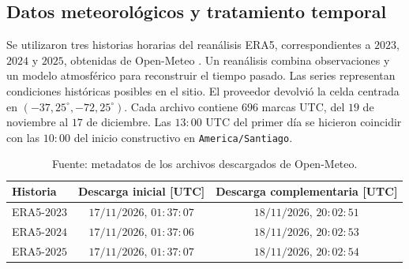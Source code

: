 \subsection{Datos meteorológicos y tratamiento temporal}
\label{sec:Meteorologicos}
Se utilizaron tres historias horarias del reanálisis ERA5, correspondientes a $2023$, $2024$ y $2025$, obtenidas de Open-Meteo \citep{hersbach2020,openmeteoHistorico}. Un reanálisis combina observaciones y un modelo atmosférico para reconstruir el tiempo pasado. Las series representan condiciones históricas posibles en el sitio. El proveedor devolvió la celda centrada en $(-37{,}25^\circ,-72{,}25^\circ)$. Cada archivo contiene $696$ marcas UTC, del $19$ de noviembre al $17$ de diciembre. Las $13{:}00$ UTC del primer día se hicieron coincidir con las $10{:}00$ del inicio constructivo en \texttt{America/Santiago}.
\begin{table}[htbp]
  \centering
  \caption{Descargas de las historias meteorológicas utilizadas}
  \label{tab:descargas-clima}
  \small
  \begin{tabular}{lcc}
    \toprule
    Historia & Descarga inicial [UTC] & Descarga complementaria [UTC] \\
    \midrule
    ERA5-$2023$ & $17/11/2026$, $01{:}37{:}07$ & $18/11/2026$, $20{:}02{:}51$ \\
    ERA5-$2024$ & $17/11/2026$, $01{:}37{:}06$ & $18/11/2026$, $20{:}02{:}53$ \\
    ERA5-$2025$ & $17/11/2026$, $01{:}37{:}07$ & $18/11/2026$, $20{:}02{:}54$ \\
    \bottomrule
  \end{tabular}
  \captionsetup{skip=2pt}
  \caption*{Fuente: metadatos de los archivos descargados de Open-Meteo.}
\end{table}
